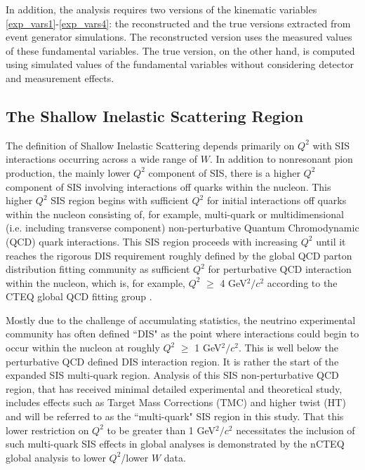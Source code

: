 \documentclass[aps, prd, twocolumn, showpacs, superscriptaddress, floatfix]{revtex4-2}
\begin{document}
In addition, the analysis requires two versions of the kinematic variables \ref{exp_vars1}-\ref{exp_vars4}: the reconstructed and the true versions extracted from event generator simulations. The reconstructed version uses the measured values of these fundamental variables. The true version, on the other hand, is computed using simulated values of the fundamental variables without considering detector and measurement effects. 

\subsection{The Shallow Inelastic Scattering Region}
\label{Sec:SISregion}
The definition of Shallow Inelastic Scattering depends primarily on $Q^2$ with SIS interactions occurring across a wide range of $W$. In addition to nonresonant pion production, the mainly lower $Q^2$ component of SIS, there is a higher $Q^2$ component of SIS involving interactions off quarks within the nucleon. This higher $Q^2$ SIS region begins with sufficient $Q^2$ for initial interactions off quarks within the nucleon consisting of, for example, multi-quark or multidimensional (i.e. including transverse component) non-perturbative Quantum Chromodynamic (QCD) quark interactions. This SIS region proceeds with increasing $Q^2$ until it reaches the rigorous DIS requirement roughly defined by the global QCD parton distribution fitting community as sufficient $Q^2$ for perturbative QCD interaction within the nucleon, which is, for example, $Q^2$ $\geq$ 4 GeV$^2/c^2$ according to the CTEQ global QCD fitting group \cite{Muzakka:2022wey}.

Mostly due to the challenge of accumulating statistics, the neutrino experimental community has often defined ``DIS" as the point where interactions could begin to occur within the nucleon at roughly $Q^2$ $\geq$ 1 GeV$^2/c^2$. This is well below the perturbative QCD defined DIS interaction region.  It is rather the start of the expanded SIS multi-quark region. Analysis of this SIS non-perturbative QCD region, that has received minimal detailed experimental and theoretical study, includes effects such as Target Mass Corrections (TMC) \cite{Ruiz:2023ozv} and higher twist (HT) \cite{Braun:2022gzl} and will be referred to as the ``multi-quark" SIS region in this study. That this lower restriction on $Q^2$ to be greater than 1 GeV$^2/c^2$ necessitates the inclusion of such multi-quark SIS effects in global analyses is demonstrated by the nCTEQ global analysis \cite{Segarra:2020gtj} to lower $Q^2$/lower $W$ data.
\end{document}
